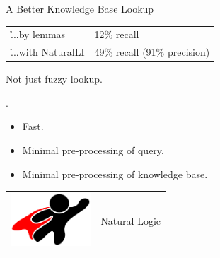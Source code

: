 \begin{frame}{A Better Knowledge Base Lookup}
  \\
  \vspace{0.25cm}
  \begin{tabular}{ll}
    \h{...by lemmas} & 12\% recall \\
    \h{...with NaturalLI} & 49\% recall (91\% precision)
  \end{tabular}
  \vspace{0.25cm}
  \pause

   Not just fuzzy lookup.
  \vspace{0.25cm}
  \pause
  
  .
  \begin{itemize}
    \item Fast.
    \item Minimal pre-processing of query.
    \item Minimal pre-processing of knowledge base.
  \end{itemize}
  \vspace{0.25cm}
  \pause

  \begin{center}
    \begin{tabular}{rl}
      \multicolumn{1}{m{3cm}}{\includegraphics[width=3cm]{../img/superhero.pdf}} &
      \huge{Natural Logic}
    \end{tabular}
  \end{center}
\end{frame}


